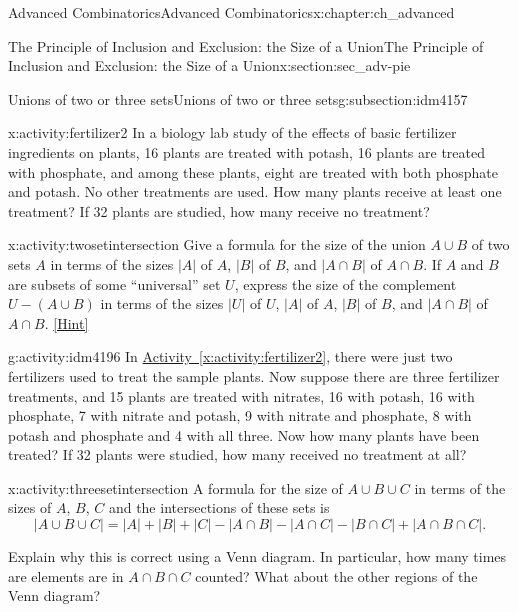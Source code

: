 \documentclass[oneside,10pt,]{book}
\numberwithin{equation}{chapter}
\begin{document}
\begin{chapterptx}{Advanced Combinatorics}{}{Advanced Combinatorics}{}{}{x:chapter:ch_advanced}
\begin{sectionptx}{The Principle of Inclusion and Exclusion: the Size of a Union}{}{The Principle of Inclusion and Exclusion: the Size of a Union}{}{}{x:section:sec_adv-pie}
\typeout{************************************************}
%
\begin{subsectionptx}{Unions of two or three sets}{}{Unions of two or three sets}{}{}{g:subsection:idm4157}
\begin{activity}{}{x:activity:fertilizer2}%
In a biology lab study of the effects of basic fertilizer ingredients on plants, 16 plants are treated with potash, 16 plants are treated with phosphate, and among these plants, eight are treated with both phosphate and potash. No other treatments are used. How many plants receive at least one treatment? If 32 plants are studied, how many receive no treatment?%
\end{activity}
\begin{activity}{}{x:activity:twosetintersection}%
Give a formula for the size of the union \(A\cup B\) of two sets \(A\) in terms of the sizes \(|A|\) of \(A\), \(|B|\) of \(B\), and \(|A\cap B|\) of \(A\cap B\). If \(A\) and \(B\) are subsets of some ``universal'' set \(U\), express the size of the complement \(U-(A\cup B)\) in terms of the sizes \(|U|\) of \(U\), \(|A|\) of \(A\), \(|B|\) of \(B\), and \(|A\cap B|\) of \(A\cap B\).%
\space\hspace*{0pt}\hfill{\tiny\hyperlink{g:hint:idm4189-back}{[Hint]}}\end{activity}
\begin{activity}{}{g:activity:idm4196}%
In \hyperref[x:activity:fertilizer2]{Activity~\ref{x:activity:fertilizer2}}, there were just two fertilizers used to treat the sample plants. Now suppose there are three fertilizer treatments, and 15 plants are treated with nitrates, 16 with potash, 16 with phosphate, 7 with nitrate and potash, 9 with nitrate and phosphate, 8 with potash and phosphate and 4 with all three. Now how many plants have been treated? If 32 plants were studied, how many received no treatment at all?%
\end{activity}
\begin{activity}{}{x:activity:threesetintersection}%
A formula for the size of \(A\cup B\cup C\) in terms of the sizes of \(A\), \(B\), \(C\) and the intersections of these sets is%
\begin{equation*}
|A\cup B\cup C|=|A|+|B|+|C|-|A\cap B|- |A\cap C| - |B\cap
C| +|A\cap B\cap C|\text{.}
\end{equation*}
%
\begin{sidebyside}{2}{0}{0}{0.1}%
\begin{sbspanel}{0.65}%
Explain why this is correct using a Venn diagram. In particular, how many times are elements are in \(A \cap B \cap C\) counted?  What about the other regions of the Venn diagram?%

\end{sbspanel}
\end{sidebyside}
\end{activity}
\end{subsectionptx}
\end{sectionptx}
\end{chapterptx}
\end{document}
